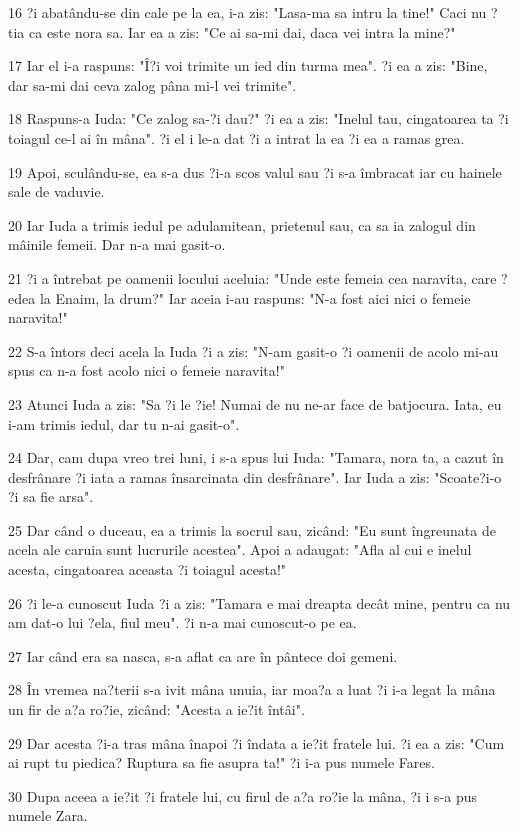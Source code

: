 \par 16 ?i abatându-se din cale pe la ea, i-a zis: "Lasa-ma sa intru la tine!" Caci nu ?tia ca este nora sa. Iar ea a zis: "Ce ai sa-mi dai, daca vei intra la mine?"
\par 17 Iar el i-a raspuns: "Î?i voi trimite un ied din turma mea". ?i ea a zis: "Bine, dar sa-mi dai ceva zalog pâna mi-l vei trimite".
\par 18 Raspuns-a Iuda: "Ce zalog sa-?i dau?" ?i ea a zis: "Inelul tau, cingatoarea ta ?i toiagul ce-l ai în mâna". ?i el i le-a dat ?i a intrat la ea ?i ea a ramas grea.
\par 19 Apoi, sculându-se, ea s-a dus ?i-a scos valul sau ?i s-a îmbracat iar cu hainele sale de vaduvie.
\par 20 Iar Iuda a trimis iedul pe adulamitean, prietenul sau, ca sa ia zalogul din mâinile femeii. Dar n-a mai gasit-o.
\par 21 ?i a întrebat pe oamenii locului aceluia: "Unde este femeia cea naravita, care ?edea la Enaim, la drum?" Iar aceia i-au raspuns: "N-a fost aici nici o femeie naravita!"
\par 22 S-a întors deci acela la Iuda ?i a zis: "N-am gasit-o ?i oamenii de acolo mi-au spus ca n-a fost acolo nici o femeie naravita!"
\par 23 Atunci Iuda a zis: "Sa ?i le ?ie! Numai de nu ne-ar face de batjocura. Iata, eu i-am trimis iedul, dar tu n-ai gasit-o".
\par 24 Dar, cam dupa vreo trei luni, i s-a spus lui Iuda: "Tamara, nora ta, a cazut în desfrânare ?i iata a ramas însarcinata din desfrânare". Iar Iuda a zis: "Scoate?i-o ?i sa fie arsa".
\par 25 Dar când o duceau, ea a trimis la socrul sau, zicând: "Eu sunt îngreunata de acela ale caruia sunt lucrurile acestea". Apoi a adaugat: "Afla al cui e inelul acesta, cingatoarea aceasta ?i toiagul acesta!"
\par 26 ?i le-a cunoscut Iuda ?i a zis: "Tamara e mai dreapta decât mine, pentru ca nu am dat-o lui ?ela, fiul meu". ?i n-a mai cunoscut-o pe ea.
\par 27 Iar când era sa nasca, s-a aflat ca are în pântece doi gemeni.
\par 28 În vremea na?terii s-a ivit mâna unuia, iar moa?a a luat ?i i-a legat la mâna un fir de a?a ro?ie, zicând: "Acesta a ie?it întâi".
\par 29 Dar acesta ?i-a tras mâna înapoi ?i îndata a ie?it fratele lui. ?i ea a zis: "Cum ai rupt tu piedica? Ruptura sa fie asupra ta!" ?i i-a pus numele Fares.
\par 30 Dupa aceea a ie?it ?i fratele lui, cu firul de a?a ro?ie la mâna, ?i i s-a pus numele Zara.

